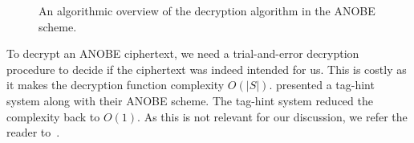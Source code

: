 \begin{frame}
  \begin{figure}
    \caption{%
      An algorithmic overview of the decryption algorithm in the \ac{ANOBE} 
      scheme.
    }\label{DecANOBE}
  \end{figure}
\end{frame}

To decrypt an \ac{ANOBE} ciphertext, we need a trial-and-error decryption 
procedure to decide if the ciphertext was indeed intended for us.
This is costly as it makes the decryption function complexity \(O(|S|)\).
\citet{ANOBE} presented a tag-hint system along with their \ac{ANOBE} scheme.
The tag-hint system reduced the complexity back to \(O(1)\).
As this is not relevant for our discussion, we refer the reader 
to~\cite{ANOBE}.


